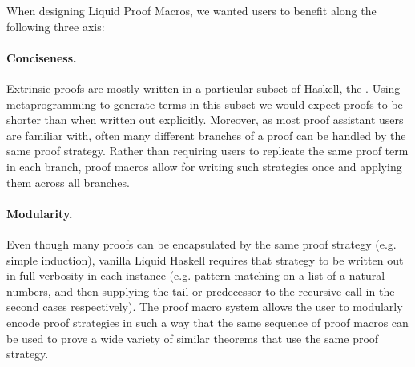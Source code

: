 


When designing Liquid Proof Macros, we wanted users to benefit along the following three axis:

\paragraph{Conciseness.}
%
Extrinsic proofs are mostly written in a particular subset of Haskell,
the \LangB. Using metaprogramming to generate terms in this subset we
would expect proofs to be shorter than when written out explicitly.
%
%
Moreover, as most proof assistant users are familiar with, often many
different branches of a proof can be handled by the same proof
strategy. Rather than requiring users to replicate the same proof term
in each branch, proof macros allow for writing such strategies once
and applying them across all branches.

\paragraph{Modularity.}
%
Even though many proofs can be encapsulated by the same proof strategy
(e.g. simple induction), vanilla Liquid Haskell requires that strategy
to be written out in full verbosity in each instance (e.g.  pattern
matching on a list of a natural numbers, and then supplying the tail
or predecessor to the recursive call in the second cases
respectively). The proof macro system allows the user to modularly
encode proof strategies in such a way that the same sequence of proof
macros can be used to prove a wide variety of similar theorems that
use the same proof strategy.


